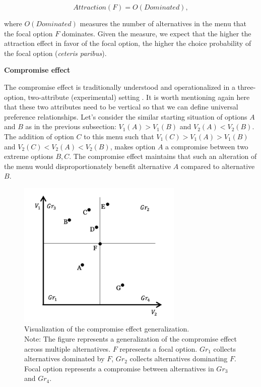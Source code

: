 \documentclass[a4paper,12pt]{article}
\begin{document}
$$Attraction(F)=O(Dominated),$$

where $O(Dominated)$ measures the number of alternatives in the menu that the focal option $F$ dominates. Given the measure, we expect that the higher the attraction effect in favor of the focal option, the higher the choice probability of the focal option (\textit{ceteris paribus}).

\textbf{Compromise effect}

The compromise effect is traditionally understood and operationalized in a three-option, two-attribute (experimental) setting \citep{simonson89, dharEtAl00}. It is worth mentioning again here that these two attributes need to be vertical so that we can define universal preference relationships. Let's consider the similar starting situation of options $A$ and $B$ as in the previous subsection: $V_1(A) > V_1(B)$ and $V_2(A) < V_2(B)$. The addition of option $C$ to this menu such that $V_1(C) > V_1(A) > V_1(B)$ and $V_2(C) < V_2(A) < V_2(B)$, makes option $A$ a compromise between two extreme options $B, C$. The compromise effect 
maintains that such an alteration of the menu would disproportionately benefit alternative $A$ compared to alternative $B$.

\begin{figure}[t]
    \centering
    \includegraphics[width=0.7\textwidth]{staticFiles/compromiseEffectZaksScatterPlot.png}
    \caption[Compromise effect generalization]{Visualization of the compromise effect generalization.\\ Note: The figure represents a generalization of the compromise effect across multiple alternatives. $F$ represents a focal option. $Gr_1$ collects alternatives dominated by $F$, $Gr_2$ collects alternatives dominating $F$. Focal option represents a compromise between alternatives in $Gr_3$ and $Gr_4$.}
    \label{fig:compromiseZakVisualization}
\end{figure}
\end{document}
